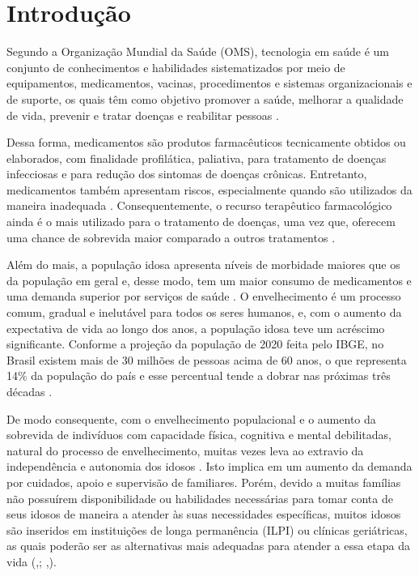 \makeatletter\@openrightfalse

\chapter[Introdução]{Introdução}

Segundo a Organização Mundial da Saúde (OMS), tecnologia em saúde é um conjunto de conhecimentos e habilidades sistematizados por meio de equipamentos, medicamentos, vacinas, procedimentos e sistemas organizacionais e de suporte, os quais têm como objetivo promover a saúde, melhorar a qualidade de vida, prevenir e tratar doenças e reabilitar pessoas \cite{OMS_2010}.

Dessa forma, medicamentos são produtos farmacêuticos tecnicamente obtidos ou elaborados, com finalidade profilática, paliativa, para tratamento de doenças infecciosas e para redução dos sintomas de doenças crônicas. Entretanto, medicamentos também apresentam riscos, especialmente quando são utilizados da maneira inadequada \cite{Gimenes2016}. Consequentemente, o recurso terapêutico farmacológico ainda é o mais utilizado para o tratamento de doenças, uma vez que, oferecem uma chance de sobrevida maior comparado a outros tratamentos \cite{Dal_2012}.

Além do mais, a população idosa apresenta níveis de morbidade maiores que os da população em geral e, desse modo, tem um maior consumo de medicamentos e uma demanda superior por serviços de saúde \cite{Dal_2012}. O envelhecimento é um processo comum, gradual e inelutável para todos os seres humanos, e, com o aumento da expectativa de vida ao longo dos anos, a população idosa teve um acréscimo significante. Conforme a projeção da população de 2020 feita pelo IBGE, no Brasil existem mais de 30 milhões de pessoas acima de 60 anos, o que representa 14\% da população do país e esse percentual tende a dobrar nas próximas três décadas \cite{IBGE_2020}.  

De modo consequente, com o envelhecimento populacional e o aumento da sobrevida de indivíduos com capacidade física, cognitiva e mental debilitadas, natural do processo de envelhecimento, muitas vezes leva ao extravio da independência e autonomia dos idosos \cite{Freitas_2006}. Isto implica em um aumento da demanda por cuidados, apoio e supervisão de familiares. Porém, devido a muitas famílias não possuírem disponibilidade ou habilidades necessárias para tomar conta de seus idosos de maneira a atender às suas necessidades específicas, muitos idosos são inseridos em instituições de longa permanência (ILPI) ou clínicas geriátricas, as quais poderão ser as alternativas mais adequadas para atender a essa etapa da vida (\citeauthor{Ipea},\citeyear{Ipea}; \citeauthor{Silva2013},\citeyear{Silva2013}).

